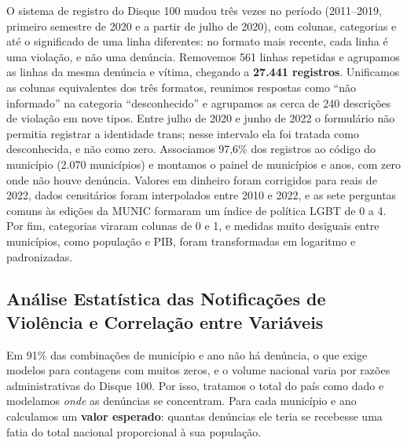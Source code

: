 \documentclass[12pt]{article}
\begin{document}
O sistema de registro do Disque 100 mudou três vezes no período (2011--2019, primeiro semestre de 2020 e a partir de julho de 2020), com colunas, categorias e até o significado de uma linha diferentes: no formato mais recente, cada linha é uma violação, e não uma denúncia. Removemos 561 linhas repetidas e agrupamos as linhas da mesma denúncia e vítima, chegando a \textbf{27.441 registros}. Unificamos as colunas equivalentes dos três formatos, reunimos respostas como ``não informado'' na categoria ``desconhecido'' e agrupamos as cerca de 240 descrições de violação em nove tipos. Entre julho de 2020 e junho de 2022 o formulário não permitia registrar a identidade trans; nesse intervalo ela foi tratada como desconhecida, e não como zero. Associamos 97,6\% dos registros ao código do município (2.070 municípios) e montamos o painel de municípios e anos, com zero onde não houve denúncia. Valores em dinheiro foram corrigidos para reais de 2022, dados censitários foram interpolados entre 2010 e 2022, e as sete perguntas comuns às edições da MUNIC formaram um índice de política LGBT de 0 a 4. Por fim, categorias viraram colunas de 0 e 1, e medidas muito desiguais entre municípios, como população e PIB, foram transformadas em logaritmo e padronizadas.

\subsection{Análise Estatística das Notificações de Violência e Correlação entre Variáveis}

Em 91\% das combinações de município e ano não há denúncia, o que exige modelos para contagens com muitos zeros, e o volume nacional varia por razões administrativas do Disque 100. Por isso, tratamos o total do país como dado e modelamos \textit{onde} as denúncias se concentram. Para cada município e ano calculamos um \textbf{valor esperado}: quantas denúncias ele teria se recebesse uma fatia do total nacional proporcional à sua população.
\end{document}

